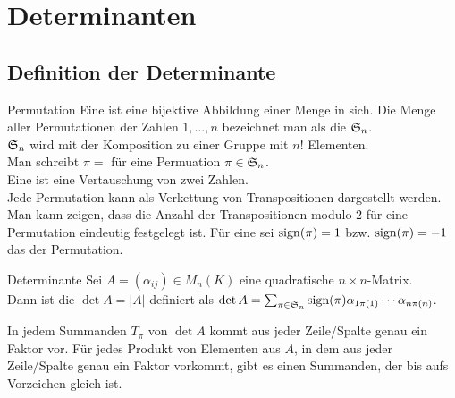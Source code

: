 \section{%
    Determinanten%
}

\subsection{%
    Definition der Determinante%
}

\begin{Def}{Permutation}
    Eine  ist eine bijektive Abbildung einer Menge in
    sich.
    Die Menge aller Permutationen der Zahlen $1, \ldots, n$ bezeichnet man
    als die  $\mathfrak{S}_n$. \\
    $\mathfrak{S}_n$ wird mit der Komposition zu einer Gruppe mit $n!$ Elementen. \\
    Man schreibt $\pi =$  für eine Permuation
    $\pi \in \mathfrak{S}_n$. \\
    Eine  ist eine Vertauschung von zwei Zahlen. \\
    Jede Permutation kann als Verkettung von Transpositionen dargestellt
    werden. \\
    Man kann zeigen, dass die Anzahl der Transpositionen modulo $2$ für eine
    Permutation eindeutig festgelegt ist.
    Für eine  sei $\operatorname{sign}(\pi) = 1$
    bzw. $\operatorname{sign}(\pi) = -1$ das  der Permutation.
\end{Def}

\begin{Def}{Determinante}
    Sei $A = (\alpha_{ij}) \in M_n(K)$ eine quadratische
    $n \times n$-Matrix. \\
    Dann ist die  $\det A = |A|$ definiert als
    $\det A = \sum_{\pi \in \mathfrak{S}_n} \operatorname{sign}(\pi) \alpha_{1 \pi(1)} \cdots
    \alpha_{n \pi(n)}$.
\end{Def}

\begin{Kor}
    In jedem Summanden $T_\pi$ von $\det A$ kommt aus jeder Zeile/Spalte
    genau ein Faktor vor.
    Für jedes Produkt von Elementen aus $A$, in dem aus jeder Zeile/Spalte
    genau ein Faktor vorkommt, gibt es einen Summanden, der bis aufs
    Vorzeichen gleich ist.
\end{Kor}

